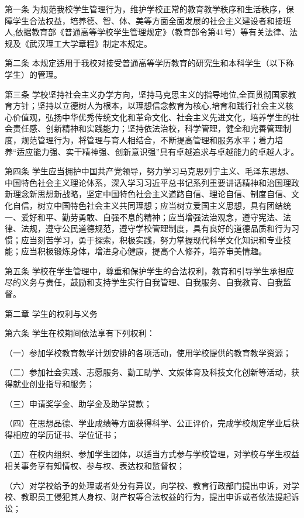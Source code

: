 \documentclass[UTF8,12pt,a4paper]{report}
\begin{document}
第一条 为规范我校学生管理行为，维护学校正常的教育教学秩序和生活秩序，保障学生合法权益，培养德、智、体、美等方面全面发展的社会主义建设者和接班人,依据教育部《普通高等学校学生管理规定》（教育部令第41号）等有关法律、法规及《武汉理工大学章程》制定本规定。

第二条 本规定适用于我校对接受普通高等学历教育的研究生和本科学生（以下称学生）的管理。

第三条 学校坚持社会主义办学方向，坚持马克思主义的指导地位,全面贯彻国家教育方针；坚持以立德树人为根本，以理想信念教育为核心,培育和践行社会主义核心价值观，弘扬中华优秀传统文化和革命文化、社会主义先进文化，培养学生的社会责任感、创新精神和实践能力；坚持依法治校，科学管理，健全和完善管理制度，规范管理行为，将管理与育人相结合，不断提高管理和服务水平；着力培养“适应能力强、实干精神强、创新意识强”具有卓越追求与卓越能力的卓越人才。

第四条 学生应当拥护中国共产党领导，努力学习马克思列宁主义、毛泽东思想、中国特色社会主义理论体系，深入学习习近平总书记系列重要讲话精神和治国理政新理念新思想新战略，坚定中国特色社会主义道路自信、理论自信、制度自信、文化自信，树立中国特色社会主义共同理想；应当树立爱国主义思想，具有团结统一、爱好和平、勤劳勇敢、自强不息的精神；应当增强法治观念，遵守宪法、法律、法规，遵守公民道德规范，遵守学校管理制度，具有良好的道德品质和行为习惯；应当刻苦学习，勇于探索，积极实践，努力掌握现代科学文化知识和专业技能；应当积极锻炼身体，增进身心健康，提高个人修养，培养审美情趣。

第五条 学校在学生管理中，尊重和保护学生的合法权利，教育和引导学生承担应尽的义务与责任，鼓励和支持学生实行自我管理、自我服务、自我教育、自我监督。



第二章 学生的权利与义务

第六条 学生在校期间依法享有下列权利：

（一）参加学校教育教学计划安排的各项活动，使用学校提供的教育教学资源；

（二）参加社会实践、志愿服务、勤工助学、文娱体育及科技文化创新等活动，获得就业创业指导和服务；

（三）申请奖学金、助学金及助学贷款；

（四）在思想品德、学业成绩等方面获得科学、公正评价，完成学校规定学业后获得相应的学历证书、学位证书；

（五）在校内组织、参加学生团体，以适当方式参与学校管理，对学校与学生权益相关事务享有知情权、参与权、表达权和监督权；

（六）对学校给予的处理或者处分有异议，向学校、教育行政部门提出申诉，对学校、教职员工侵犯其人身权、财产权等合法权益的行为，提出申诉或者依法提起诉讼；
\end{document}
